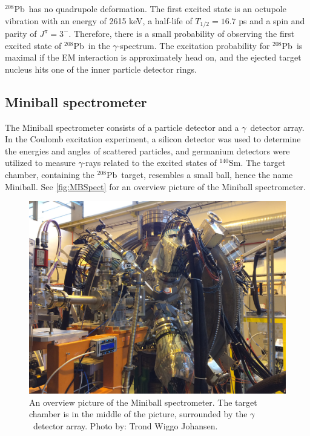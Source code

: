 \documentclass[twoside,english]{uiofysmaster/uiofysmaster}
\newcommand{\Sm}{$^{140}$Sm} %
\newcommand{\Pb}{$^{208}$Pb}
\newcommand{\ga}{$\gamma$}
\let\orgautoref\autoref
\renewcommand{\autoref}
        {%
		 \def\sectionautorefname{Section}%
		 \def\subsectionautorefname{Section}%
		 \def\subsubsectionautorefname{Section}%
		 \def\chapterautorefname{Chapter}%
          \orgautoref}
\begin{document}
\Pb\ has no quadrupole deformation.
The first excited state is an octupole vibration with an energy of 2615 keV, a half-life of $T_{1/2} = 16.7$ ps and a spin and parity of $J^\pi = 3^-$.
Therefore, there is a small probability of observing the first excited state of \Pb\ in the \ga-spectrum. 
The excitation probability for \Pb\ is maximal if the EM interaction is approximately head on, and the ejected target nucleus hits one of the inner particle detector rings.


\subsection{Miniball spectrometer}
The Miniball spectrometer consists of a particle detector and a \ga\ detector array.
In the Coulomb excitation experiment, a silicon detector was used to determine the energies and angles of scattered particles, and germanium detectors were utilized to measure \ga-rays related to the excited states of \Sm.
The target chamber, containing the \Pb\ target, resembles a small ball, hence the name Miniball.
See \autoref{fig:MBSpect} for an overview picture of the Miniball spectrometer. 


\begin{figure}[ht]
	\centering
	\includegraphics[width=\linewidth]{Images/IMG3849.JPG}
	\caption{An overview picture of the Miniball spectrometer. The target chamber is in the middle of the picture, surrounded by the \ga\ detector array. Photo by: Trond Wiggo Johansen.}
	\label{fig:MBSpect}
\end{figure}
\end{document}
